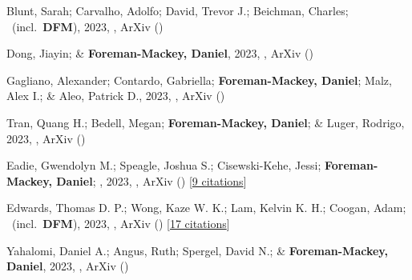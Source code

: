 \item[{\color{numcolor}\scriptsize97}] Blunt, Sarah; Carvalho, Adolfo; David, Trevor J.; Beichman, Charles; \etal\ (incl.\ \textbf{DFM}), 2023, , ArXiv ()

\item[{\color{numcolor}\scriptsize96}] Dong, Jiayin; \& \textbf{Foreman-Mackey, Daniel}, 2023, , ArXiv ()

\item[{\color{numcolor}\scriptsize95}] Gagliano, Alexander; Contardo, Gabriella; \textbf{Foreman-Mackey, Daniel}; Malz, Alex I.; \& Aleo, Patrick D., 2023, , ArXiv ()

\item[{\color{numcolor}\scriptsize94}] Tran, Quang H.; Bedell, Megan; \textbf{Foreman-Mackey, Daniel}; \& Luger, Rodrigo, 2023, , ArXiv ()

\item[{\color{numcolor}\scriptsize93}] Eadie, Gwendolyn M.; Speagle, Joshua S.; Cisewski-Kehe, Jessi; \textbf{Foreman-Mackey, Daniel}; \etal, 2023, , ArXiv () [\href{https://ui.adsabs.harvard.edu/abs/2023arXiv230204703E}{9 citations}]

\item[{\color{numcolor}\scriptsize92}] Edwards, Thomas D. P.; Wong, Kaze W. K.; Lam, Kelvin K. H.; Coogan, Adam; \etal\ (incl.\ \textbf{DFM}), 2023, , ArXiv () [\href{https://ui.adsabs.harvard.edu/abs/2023arXiv230205329E}{17 citations}]

\item[{\color{numcolor}\scriptsize91}] Yahalomi, Daniel A.; Angus, Ruth; Spergel, David N.; \& \textbf{Foreman-Mackey, Daniel}, 2023, , ArXiv ()

